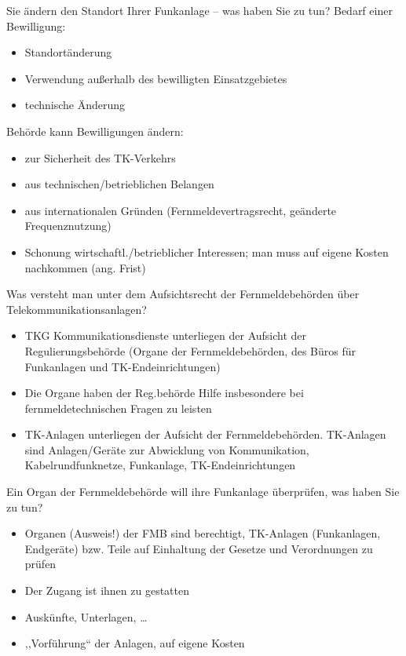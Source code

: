 \documentclass[avery5371,grid,frame,a4paper]{flashcards}
\newcommand{\card}[3]{
  \begin{flashcard}[{\chap} -- #1]{#2}#3\end{flashcard}
}
\begin{document}
\card{12}{Sie ändern den Standort Ihrer Funkanlage – was haben Sie zu tun?}{
  \footnotesize
  Bedarf einer Bewilligung:
    \begin{itemize}
      \item Standortänderung
      \item Verwendung außerhalb des bewilligten Einsatzgebietes
      \item technische Änderung
    \end{itemize}
  Behörde kann Bewilligungen ändern:
    \begin{itemize}
      \item zur Sicherheit des TK-Verkehrs
      \item aus technischen/betrieblichen Belangen
      \item aus internationalen Gründen (Fernmeldevertragsrecht, geänderte Frequenznutzung)
      \item Schonung wirtschaftl./betrieblicher Interessen; man muss auf eigene Kosten nachkommen (ang. Frist)
    \end{itemize}
}

\card{13}{Was versteht man unter dem Aufsichtsrecht der Fernmeldebehörden über Telekommunikationsanlagen?}{
  \small
  \begin{itemize}
    \item
      TKG Kommunikationsdienste unterliegen der Aufsicht der Regulierungsbehörde
      (Organe der Fernmeldebehörden, des Büros für Funkanlagen und TK-Endeinrichtungen)
    \item
      Die Organe haben der Reg.behörde Hilfe insbesondere bei fernmeldetechnischen Fragen zu leisten
    \item
      TK-Anlagen unterliegen der Aufsicht der Fernmeldebehörden.
      TK-Anlagen sind Anlagen/Geräte zur Abwicklung von Kommunikation, Kabelrundfunknetze, Funkanlage, TK-Endeinrichtungen
  \end{itemize}
}

\card{14}{Ein Organ der Fernmeldebehörde will ihre Funkanlage überprüfen, was haben Sie zu tun?}{
  \begin{itemize}
    \item Organen (Ausweis!) der FMB sind berechtigt, TK-Anlagen (Funkanlagen, Endgeräte) bzw. Teile auf Einhaltung der Gesetze und Verordnungen zu prüfen
    \item Der Zugang ist ihnen zu gestatten
    \item Auskünfte, Unterlagen, \dots
    \item ,,Vorführung`` der Anlagen, auf eigene Kosten
  \end{itemize}
}
\end{document}

